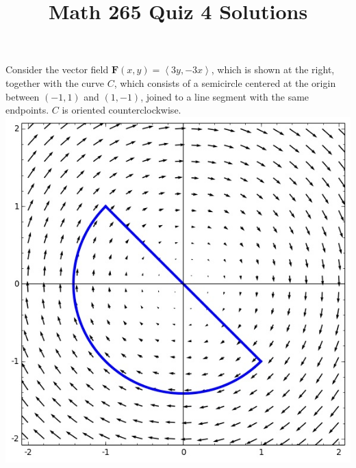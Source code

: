 \documentclass[12pt]{article}
\title{Math 265 Quiz 4 Solutions}\author{}\date{}
\begin{document}
\maketitle
\thispagestyle{empty}

\begin{multicols}{2}
Consider the vector field $\mathbold{F}\left(x,y\right)
=\left\langle 3y,-3x\right\rangle$, which is shown
at the right, together with the curve $C$,
which consists of a semicircle centered at the origin
between $\left(-1,1\right)$ and $\left(1,-1\right)$,
joined to a line segment with the same endpoints.
$C$ is oriented counterclockwise.
\includegraphics[scale=.6]{Cardioid}
\end{multicols}
\end{document}

